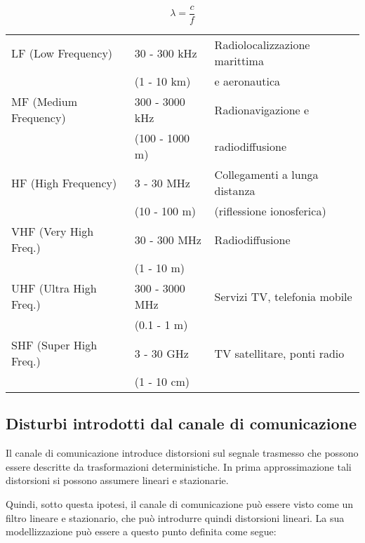 \[
\lambda = \frac{c}{f}
\]

\begin{tabular}{lll}
LF (Low Frequency) & 30 - 300 kHz & Radiolocalizzazione marittima \\
 & (1 - 10 km) & e aeronautica \\
MF (Medium Frequency) & 300 - 3000 kHz & Radionavigazione e \\
 & (100 - 1000 m) & radiodiffusione \\
HF (High Frequency) & 3 - 30 MHz & Collegamenti a lunga distanza \\
 & (10 - 100 m) & (riflessione ionosferica) \\
VHF (Very High Freq.) & 30 - 300 MHz & Radiodiffusione \\
 & (1 - 10 m) & \\
UHF (Ultra High Freq.) & 300 - 3000 MHz & Servizi TV, telefonia mobile \\
 & (0.1 - 1 m) & \\
SHF (Super High Freq.) & 3 - 30 GHz & TV satellitare, ponti radio \\
 & (1 - 10 cm) & \\
\end{tabular}


\subsection*{
    Disturbi introdotti dal canale di comunicazione
}
Il canale di comunicazione introduce distorsioni sul segnale trasmesso che possono essere descritte da trasformazioni deterministiche. In prima approssimazione tali distorsioni si possono assumere lineari e stazionarie.


Quindi, sotto questa ipotesi, il canale di comunicazione può essere visto come un filtro lineare e stazionario, che può introdurre quindi distorsioni lineari. La sua modellizzazione può essere a questo punto definita come segue:
\begin{center}
\end{center}


